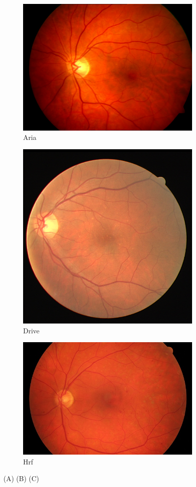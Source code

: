 \begin{figure}[H]
    \centering
    \begin{subfigure}[b]{0.3\textwidth}
				\centering
        \includegraphics[height=3cm\textwidth]{./Figures/imagesARIA.png}
        \caption{Aria}
        \label{fig:Aria}
    \end{subfigure}
    \begin{subfigure}[b]{0.3\textwidth}
				\centering
        \includegraphics[height=3cm\textwidth]{./Figures/imagesDRIVE.png}
        \caption{Drive}
        \label{fig:Drive}
    \end{subfigure}
    \begin{subfigure}[b]{0.3\textwidth}
				\centering
        \includegraphics[height=3cm\textwidth]{./Figures/imagesHRF.png}
        \caption{Hrf}
        \label{fig:Hrf}
    \end{subfigure}        
    \label{fig:Imagenes de fondo de ojo}
    \caption{(A) (B) (C)}
\end{figure}

